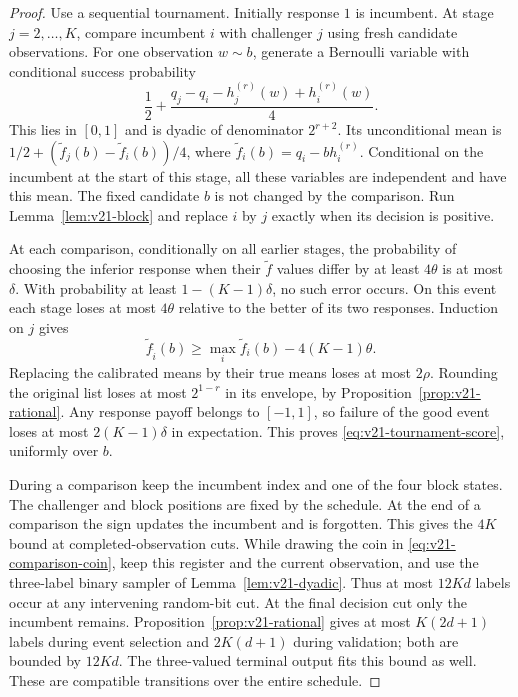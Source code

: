 \begin{proof}
Use a sequential tournament. Initially response $1$ is incumbent.
At stage $j=2,\ldots,K$, compare incumbent $i$ with challenger $j$ using
fresh candidate observations. For one observation $w\sim b$, generate
a Bernoulli variable with conditional success probability
\begin{equation}\label{eq:v21-comparison-coin}
 \frac12+\frac{q_j-q_i-h_j^{(r)}(w)+h_i^{(r)}(w)}4.
\end{equation}
This lies in $[0,1]$ and is dyadic of denominator $2^{r+2}$.
Its unconditional mean is
$1/2+(\widetilde f_j(b)-\widetilde f_i(b))/4$, where
$\widetilde f_i(b)=q_i-bh_i^{(r)}$. Conditional on the incumbent at
the start of this stage, all these variables are independent and have
this mean. The fixed candidate $b$ is not changed by the comparison.
Run Lemma~\ref{lem:v21-block} and replace $i$ by $j$ exactly when its
decision is positive.

At each comparison, conditionally on all earlier stages, the probability
of choosing the inferior response when their $\widetilde f$ values
differ by at least $4\theta$ is at most $\delta$. With probability at
least $1-(K-1)\delta$, no such error occurs. On this event each stage
loses at most $4\theta$ relative to the better of its two responses.
Induction on $j$ gives
\[
 \widetilde f_{\widehat i}(b)\ge
           \max_i\widetilde f_i(b)-4(K-1)\theta.
\]
Replacing the calibrated means by their true means loses at most
$2\rho$. Rounding the original list loses at most $2^{1-r}$ in its
envelope, by Proposition~\ref{prop:v21-rational}. Any response payoff
belongs to $[-1,1]$, so failure of the good event loses at most
$2(K-1)\delta$ in expectation. This proves
\eqref{eq:v21-tournament-score}, uniformly over $b$.

During a comparison keep the incumbent index and one of the four block
states. The challenger and block positions are fixed by the schedule.
At the end of a comparison the sign updates the incumbent and is
forgotten. This gives the $4K$ bound at completed-observation cuts.
While drawing the coin in \eqref{eq:v21-comparison-coin}, keep this
register and the current observation, and use the three-label binary
sampler of Lemma~\ref{lem:v21-dyadic}. Thus at most $12Kd$ labels occur
at any intervening random-bit cut. At the final decision cut only the
incumbent remains. Proposition~\ref{prop:v21-rational} gives at most
$K(2d+1)$ labels during event selection and $2K(d+1)$ during validation;
both are bounded by $12Kd$. The three-valued terminal output fits this
bound as well. These are compatible transitions over the entire schedule.


\end{proof}
